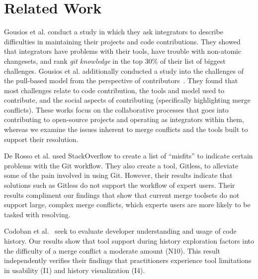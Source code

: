 \section{Related Work}\label{related_work}

Gousios et al. \cite{integrator_perspective} conduct a study in which they ask integrators to describe difficulties in maintaining their projects and code contributions. 
They showed that integrators have problems with their tools, have trouble with non-atomic changesets, and rank \textit{git knowledge} in the top 30\% of their list of biggest challenges. 
Gousios et al. additionally conducted a study into the challenges of the pull-based model from the perspective of contributors~\cite{gousios2016work}. 
They found that most challenges relate to code contribution, the tools and model used to contribute, and the social aspects of contributing (specifically highlighting merge conflicts).
These works focus on the collaborative processes that goes into contributing to open-source projects and operating as integrators within them, whereas we examine the issues inherent to merge conflicts and the tools built to support their resolution.

De Rosso et al. \cite{DeRosso2016} used StackOverflow to create a list of ``misfits'' to indicate certain problems with the Git workflow. 
They also create a tool, Gitless, to alleviate some of the pain involved in using Git.
However, their results indicate that solutions such as Gitless do not support the workflow of expert users.
Their results compliment our findings that show that current merge toolsets do not support large, complex merge conflicts, which experts users are more likely to be tasked with resolving.

Codoban et al.~\cite{Mihai_lenses} seek to evaluate developer understanding and usage of code history. Our results show that tool support during history exploration factors into the difficulty of a merge conflict a moderate amount (N10). This result independently verifies their findings that practitioners experience tool limitations in usability (I1) and history visualization (I4).